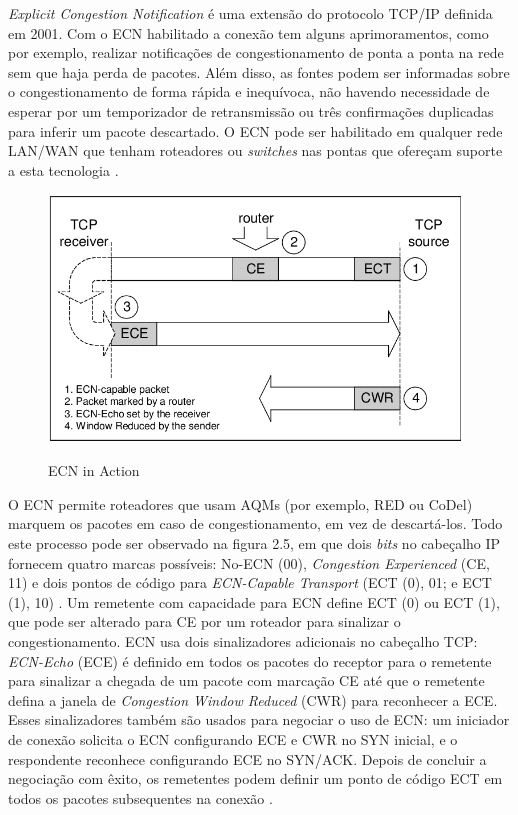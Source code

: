 \emph{Explicit Congestion Notification} é uma extensão do protocolo TCP/IP definida em 2001. Com o ECN habilitado a conexão tem alguns aprimoramentos, como por exemplo, realizar notificações de congestionamento de ponta a ponta na rede sem que haja perda de pacotes. Além disso, as fontes podem ser informadas sobre o congestionamento de forma rápida e inequívoca, não havendo necessidade de esperar por um temporizador de retransmissão ou três confirmações duplicadas para inferir um pacote descartado. O ECN pode ser habilitado em qualquer rede LAN/WAN que tenham roteadores ou \emph{switches} nas pontas que ofereçam suporte a esta tecnologia \cite{floyd2000addition}.

\begin{figure}[htp]
    \centering
    \includegraphics[width=11cm]{2-fundam/Figura_3.jpg}
    \caption{ECN in Action}
    \cite{malowidzki2003simulation}
    \label{fig:ECNinAction}
\end{figure}

O ECN permite roteadores que usam AQMs (por exemplo, RED ou CoDel) marquem os pacotes em caso de congestionamento, em vez de descartá-los. Todo este processo pode ser observado na figura 2.5, em que dois \emph{bits} no cabeçalho IP fornecem quatro marcas possíveis: No-ECN (00), \emph{Congestion Experienced} (CE, 11) e dois pontos de código para \emph{ECN-Capable Transport} (ECT (0), 01; e ECT (1), 10) . Um remetente com capacidade para ECN define ECT (0) ou ECT (1), que pode ser alterado para CE por um roteador para sinalizar o congestionamento. ECN usa dois sinalizadores adicionais no cabeçalho TCP: \emph{ECN-Echo} (ECE) é definido em todos os pacotes do receptor para o remetente para sinalizar a chegada de um pacote com marcação CE até que o remetente defina a janela de \emph{Congestion Window Reduced} (CWR) para reconhecer a ECE. Esses sinalizadores também são usados para negociar o uso de ECN: um iniciador de conexão solicita o ECN configurando ECE e CWR no SYN inicial, e o respondente reconhece configurando ECE no SYN/ACK. Depois de concluir a negociação com êxito, os remetentes podem definir um ponto de código ECT em todos os pacotes subsequentes na conexão \cite{kuhlewind2013state}.

